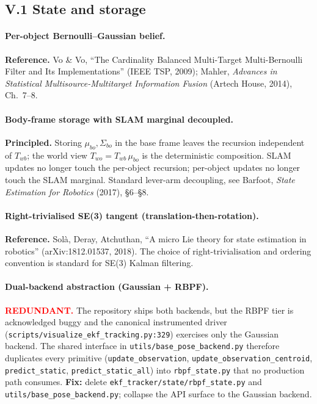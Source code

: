 \documentclass[11pt]{article}
\newcommand{\REDUNDANT}{\textcolor{red}{\textbf{REDUNDANT.}}}
\newcommand{\REFERENCE}{\textbf{Reference.}}
\newcommand{\PRINCIPLED}{\textbf{Principled.}}
\begin{document}
\subsection*{V.1 State and storage}

\paragraph{Per-object Bernoulli--Gaussian belief.}
\REFERENCE{} Vo \& Vo, ``The Cardinality Balanced Multi-Target
Multi-Bernoulli Filter and Its Implementations'' (IEEE TSP, 2009);
Mahler, \emph{Advances in Statistical Multisource-Multitarget
Information Fusion} (Artech House, 2014), Ch.~7--8.

\paragraph{Body-frame storage with SLAM marginal decoupled.}
\PRINCIPLED{} Storing $\mu_{bo},\Sigma_{bo}$ in the base frame leaves
the recursion independent of $T_{wb}$; the world view
$T_{wo}=T_{wb}\,\mu_{bo}$ is the deterministic composition. SLAM
updates no longer touch the per-object recursion; per-object updates
no longer touch the SLAM marginal. Standard lever-arm decoupling, see
Barfoot, \emph{State Estimation for Robotics} (2017), \S 6--\S 8.

\paragraph{Right-trivialised SE(3) tangent (translation-then-rotation).}
\REFERENCE{} Sol\`a, Deray, Atchuthan, ``A micro Lie theory for state
estimation in robotics'' (arXiv:1812.01537, 2018). The choice of
right-trivialisation and ordering convention is standard for SE(3)
Kalman filtering.

\paragraph{Dual-backend abstraction (Gaussian + RBPF).}
\REDUNDANT{} The repository ships both backends, but the RBPF tier is
acknowledged buggy and the canonical instrumented driver
(\texttt{scripts/visualize\_ekf\_tracking.py:329}) exercises only the
Gaussian backend. The shared interface in
\texttt{utils/base\_pose\_backend.py} therefore duplicates every
primitive (\texttt{update\_observation},
\texttt{update\_observation\_centroid}, \texttt{predict\_static},
\texttt{predict\_static\_all}) into \texttt{rbpf\_state.py} that no
production path consumes.
\textbf{Fix:} delete \texttt{ekf\_tracker/state/rbpf\_state.py} and
\texttt{utils/base\_pose\_backend.py}; collapse the API surface to the
Gaussian backend.
\end{document}
